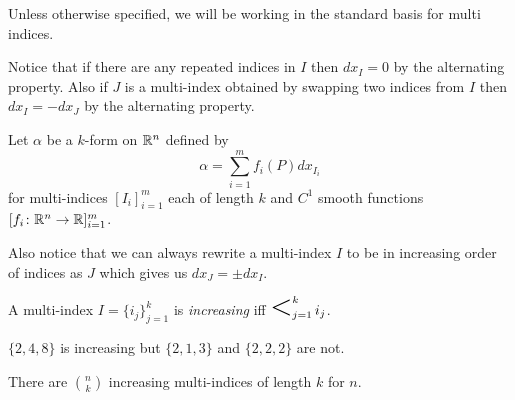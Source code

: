 \documentclass[notes]{subfiles}
\begin{document}
Unless otherwise specified, we will be working in the standard basis for multi indices.

Notice that if there are any repeated indices in $I$ then $dx_I = 0$ by the alternating property. Also if $J$ is a multi-index obtained by swapping two indices from $I$ then $dx_I = -dx_J$ by the alternating property.

\begin{example}
    Let $\alpha$ be a $k$-form on $\mathbb{R}^n$ defined by
    \[
        \alpha = \sum_{i = 1}^m f_i(P) dx_{I_i}
    \]
    for multi-indices $[I_i]_{i = 1}^m$ each of length $k$ and $C^1$ smooth functions $[f_i\colon \mathbb{R}^n \to \mathbb{R}]_{i = 1}^m$.
\end{example}

Also notice that we can always rewrite a multi-index $I$ to be in increasing order of indices as $J$ which gives us $dx_J = \pm dx_I$.

\begin{definition}
    A multi-index $I = \{ i_j \}_{j = 1}^k$ is \textit{increasing} iff $\bigless_{j = 1}^{k} i_j$.
\end{definition}

\begin{example}
    $\{ 2, 4, 8 \}$ is increasing but $\{ 2, 1, 3 \}$ and $\{ 2, 2, 2 \}$ are not.
\end{example}

\begin{lemma}
    There are $\binom{n}{k}$ increasing multi-indices of length $k$ for $n$.
\end{lemma}
\end{document}
